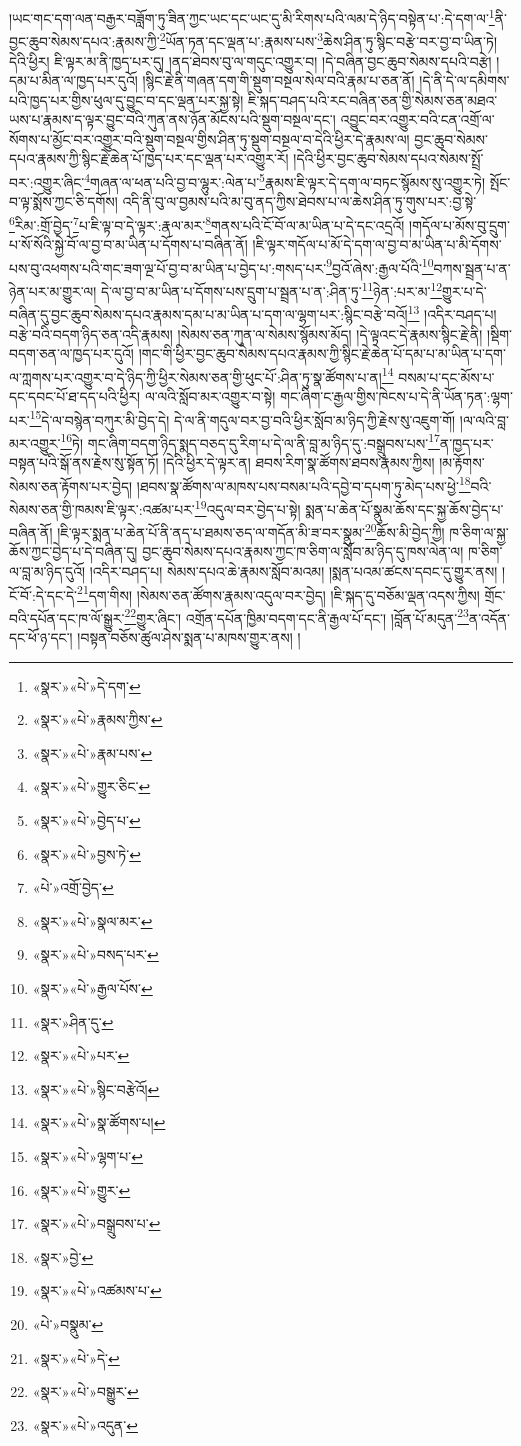 །ཡང་གང་དག་ལན་བརྒྱར་བཟློག་ཏུ་ཟིན་ཀྱང་ཡང་དང་ཡང་དུ་མི་རིགས་པའི་ལམ་དེ་ཉིད་བསྟེན་པ་:དེ་དག་ལ་\footnote{«སྣར་»«པེ་»དེ་དག་}ནི་བྱང་ཆུབ་སེམས་དཔའ་:རྣམས་ཀྱི་\footnote{«སྣར་»«པེ་»རྣམས་ཀྱིས་}ཡོན་ཏན་དང་ལྡན་པ་:རྣམས་པས་\footnote{«སྣར་»«པེ་»རྣམ་པས་}ཆེས་ཤིན་ཏུ་སྙིང་བརྩེ་བར་བྱ་བ་ཡིན་ཏེ། དེའི་ཕྱིར། ཇི་ལྟར་མ་ནི་ཁྱད་པར་དུ། །ནད་ཐེབས་བུ་ལ་གདུང་འགྱུར་བ། །དེ་བཞིན་བྱང་ཆུབ་སེམས་དཔའི་བརྩེ། །དམ་པ་མིན་ལ་ཁྱད་པར་དུའོ། །སྙིང་རྗེ་ནི་གཞན་དག་གི་སྡུག་བསྔལ་སེལ་བའི་རྣམ་པ་ཅན་ནོ། །དེ་ནི་དེ་ལ་དམིགས་པའི་ཁྱད་པར་གྱིས་ཕུལ་དུ་བྱུང་བ་དང་ལྡན་པར་སྐྱ་སྟེ། ཇི་སྐད་བཤད་པའི་རང་བཞིན་ཅན་གྱི་སེམས་ཅན་མཐའ་ཡས་པ་རྣམས་ད་ལྟར་བྱུང་བའི་ཀུན་ནས་ཉོན་མོངས་པའི་སྡུག་བསྔལ་དང་། འབྱུང་བར་འགྱུར་བའི་ངན་འགྲོ་ལ་སོགས་པ་མྱོང་བར་འགྱུར་བའི་སྡུག་བསྔལ་གྱིས་ཤིན་ཏུ་སྡུག་བསྔལ་བ་དེའི་ཕྱིར་དེ་རྣམས་ལ། བྱང་ཆུབ་སེམས་དཔའ་རྣམས་ཀྱི་སྙིང་རྗེ་ཆེན་པོ་ཁྱད་པར་དང་ལྡན་པར་འགྱུར་རོ། །དེའི་ཕྱིར་བྱང་ཆུབ་སེམས་དཔའ་སེམས་སྤྲོ་བར་:འགྱུར་ཞིང་\footnote{«སྣར་»«པེ་»གྱུར་ཅིང་}གཞན་ལ་ཕན་པའི་བྱ་བ་ལྷུར་:ལེན་པ་\footnote{«སྣར་»«པེ་»བྱེད་པ་}རྣམས་ཇི་ལྟར་དེ་དག་ལ་བཏང་སྙོམས་སུ་འགྱུར་ཏེ། སྤོང་བ་ལྟ་སྨོས་ཀྱང་ཅི་དགོས། འདི་ནི་བུ་ལ་བྱམས་པའི་མ་བུ་ནད་ཀྱིས་ཐེབས་པ་ལ་ཆེས་ཤིན་ཏུ་གུས་པར་:བྱ་སྟེ་\footnote{«སྣར་»«པེ་»བྱས་ཏེ་}རིམ་:གྲོ་བྱེད་\footnote{«པེ་»འགྲོ་བྱེད་}པ་ཇི་ལྟ་བ་དེ་ལྟར་:རྣལ་མར་\footnote{«སྣར་»«པེ་»སྣལ་མར་}གནས་པའི་ངོ་བོ་ལ་མ་ཡིན་པ་དེ་དང་འདྲའོ། །གདོལ་པ་མོས་བུ་དྲུག་པ་སོ་སོའི་སྐྱེ་བོ་ལ་བྱ་བ་མ་ཡིན་པ་དོགས་པ་བཞིན་ནོ། །ཇི་ལྟར་གདོལ་པ་མོ་དེ་དག་ལ་བྱ་བ་མ་ཡིན་པ་མི་དོགས་པས་བུ་འཕགས་པའི་གང་ཟག་ལྔ་པོ་བྱ་བ་མ་ཡིན་པ་བྱེད་པ་:གསད་པར་\footnote{«སྣར་»«པེ་»བསད་པར་}བྱའོ་ཞེས་:རྒྱལ་པོའི་\footnote{«སྣར་»«པེ་»རྒྱལ་པོས་}བཀས་སྦྲན་པ་ན་ཉེན་པར་མ་གྱུར་ལ། དེ་ལ་བྱ་བ་མ་ཡིན་པ་དོགས་པས་དྲུག་པ་སྦྲན་པ་ན་:ཤིན་ཏུ་\footnote{«སྣར་»ཤིན་དུ་}ཉེན་:པར་མ་\footnote{«སྣར་»«པེ་»པར་}གྱུར་པ་དེ་བཞིན་དུ་བྱང་ཆུབ་སེམས་དཔའ་རྣམས་དམ་པ་མ་ཡིན་པ་དག་ལ་ལྷག་པར་:སྙིང་བརྩེ་བའོ།\footnote{«སྣར་»«པེ་»སྙིང་བརྩེའོ།} །འདིར་བཤད་པ། བརྩེ་བའི་བདག་ཉིད་ཅན་འདི་རྣམས། །སེམས་ཅན་ཀུན་ལ་སེམས་སྙོམས་མོད། །དེ་ལྟའང་དེ་རྣམས་སྙིང་རྗེ་ནི། །སྡིག་བདག་ཅན་ལ་ཁྱད་པར་དུའོ། །གང་གི་ཕྱིར་བྱང་ཆུབ་སེམས་དཔའ་རྣམས་ཀྱི་སྙིང་རྗེ་ཆེན་པོ་དམ་པ་མ་ཡིན་པ་དག་ལ་ཀླགས་པར་འགྱུར་བ་དེ་ཉིད་ཀྱི་ཕྱིར་སེམས་ཅན་གྱི་ཕུང་པོ་:ཤིན་ཏུ་སྣ་ཚོགས་པ་ན།\footnote{«སྣར་»«པེ་»སྣ་ཚོགས་པ།} བསམ་པ་དང་མོས་པ་དང་དབང་པོ་ཐ་དད་པའི་ཕྱིར། ལ་ལའི་སློབ་མར་འགྱུར་བ་སྟེ། གང་ཞིག་ང་རྒྱལ་གྱིས་ཁེངས་པ་དེ་ནི་ཡོན་ཏན་:ལྷག་པར་\footnote{«སྣར་»«པེ་»ལྷག་པ་}དེ་ལ་བསྙེན་བཀུར་མི་བྱེད་དེ། དེ་ལ་ནི་གདུལ་བར་བྱ་བའི་ཕྱིར་སློབ་མ་ཉིད་ཀྱི་རྗེས་སུ་འཇུག་གོ། །ལ་ལའི་བླ་མར་འགྱུར་\footnote{«སྣར་»«པེ་»གྱུར་}ཏེ། གང་ཞིག་བདག་ཉིད་སྨད་བཅད་དུ་རིག་པ་དེ་ལ་ནི་བླ་མ་ཉིད་དུ་:བསྒྲུབས་པས་\footnote{«སྣར་»«པེ་»བསྒྲུབས་པ་}ན་ཁྱད་པར་བསྟན་པའི་སྒོ་ནས་རྗེས་སུ་སྟོན་ཏོ། །དེའི་ཕྱིར་དེ་ལྟར་ན། ཐབས་རིག་སྣ་ཚོགས་ཐབས་རྣམས་ཀྱིས། །མ་རྟོགས་སེམས་ཅན་རྟོགས་པར་བྱེད། །ཐབས་སྣ་ཚོགས་ལ་མཁས་པས་བསམ་པའི་དབྱེ་བ་དཔག་ཏུ་མེད་པས་ཕྱེ་\footnote{«སྣར་»བྱེ་}བའི་སེམས་ཅན་གྱི་ཁམས་ཇི་ལྟར་:འཚམ་པར་\footnote{«སྣར་»«པེ་»འཚམས་པ་}འདུལ་བར་བྱེད་པ་སྟེ། སྨན་པ་ཆེན་པོ་སྣུམ་ཆོས་དང་སྐྱ་ཆོས་བྱེད་པ་བཞིན་ནོ། །ཇི་ལྟར་སྨན་པ་ཆེན་པོ་ནི་ནད་པ་ཐམས་ཅད་ལ་གདོན་མི་ཟ་བར་སྣུམ་\footnote{«པེ་»བསྣུམ་}ཆོས་མི་བྱེད་ཀྱི། ཁ་ཅིག་ལ་སྐྱ་ཆོས་ཀྱང་བྱེད་པ་དེ་བཞིན་དུ། བྱང་ཆུབ་སེམས་དཔའ་རྣམས་ཀྱང་ཁ་ཅིག་ལ་སློབ་མ་ཉིད་དུ་ཁས་ལེན་ལ། ཁ་ཅིག་ལ་བླ་མ་ཉིད་དུའོ། །འདིར་བཤད་པ། སེམས་དཔའ་ཆེ་རྣམས་སློབ་མའམ། །སྨན་པའམ་ཚངས་དབང་དུ་གྱུར་ནས། །ངོ་བོ་:དེ་དང་དེ་\footnote{«སྣར་»«པེ་»དེ་}དག་གིས། །སེམས་ཅན་ཚོགས་རྣམས་འདུལ་བར་བྱེད། །ཇི་སྐད་དུ་བཅོམ་ལྡན་འདས་ཀྱིས། གྲོང་བའི་དཔོན་དང་ཁ་ལོ་སྒྱུར་\footnote{«སྣར་»«པེ་»བསྒྱུར་}གྱུར་ཞིང་། འགྲོན་དཔོན་ཁྱིམ་བདག་དང་ནི་རྒྱལ་པོ་དང་། །བློན་པོ་མདུན་\footnote{«སྣར་»«པེ་»འདུན་}ན་འདོན་དང་ཕོ་ཉ་དང་། །བསྟན་བཅོས་ཚུལ་ཤེས་སྨན་པ་མཁས་གྱུར་ནས། །
